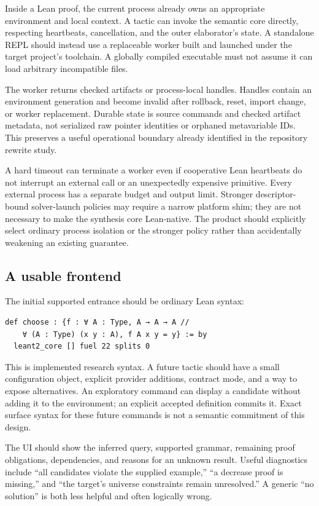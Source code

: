 \documentclass[11pt,letterpaper]{article}
\newcommand{\code}[1]{\texttt{\detokenize{#1}}}
\theoremstyle{definition}\newtheorem{definition}[theorem]{Definition}
\theoremstyle{remark}\newtheorem{remark}[theorem]{Remark}
\begin{document}
Inside a Lean proof, the current process already owns an appropriate environment
and local context. A tactic can invoke the semantic core directly, respecting
heartbeats, cancellation, and the outer elaborator's state. A standalone REPL
should instead use a replaceable worker built and launched under the target
project's toolchain. A globally compiled executable must not assume it can load
arbitrary incompatible \code{.olean} files.

The worker returns checked artifacts or process-local handles. Handles contain an
environment generation and become invalid after rollback, reset, import change,
or worker replacement. Durable state is source commands and checked artifact
metadata, not serialized raw pointer identities or orphaned metavariable IDs.
This preserves a useful operational boundary already identified in the repository
rewrite study.\cite{rewrite}

A hard timeout can terminate a worker even if cooperative Lean heartbeats do not
interrupt an external call or an unexpectedly expensive primitive. Every
external process has a separate budget and output limit. Stronger descriptor-bound
solver-launch policies may require a narrow platform shim; they are not necessary
to make the synthesis core Lean-native. The product should explicitly select
ordinary process isolation or the stronger policy rather than accidentally
weakening an existing guarantee.\cite{djexarch}

\subsection{A usable frontend}

The initial supported entrance should be ordinary Lean syntax:
\begin{lstlisting}
def choose : {f : ∀ A : Type, A → A → A //
    ∀ (A : Type) (x y : A), f A x y = y} := by
  leant2_core [] fuel 22 splits 0
\end{lstlisting}
This is implemented research syntax. A future \code{leant2} tactic should have a
small configuration object, explicit provider additions, contract mode, and a
way to expose alternatives. An exploratory \code{#synth} command can display a
candidate without adding it to the environment; an explicit accepted definition
commits it. Exact surface syntax for these future commands is not a semantic
commitment of this design.

The UI should show the inferred query, supported grammar, remaining proof
obligations, dependencies, and reasons for an unknown result. Useful diagnostics
include ``all candidates violate the supplied example,'' ``a decrease proof is
missing,'' and ``the target's universe constraints remain unresolved.'' A generic
``no solution'' is both less helpful and often logically wrong.
\end{document}

